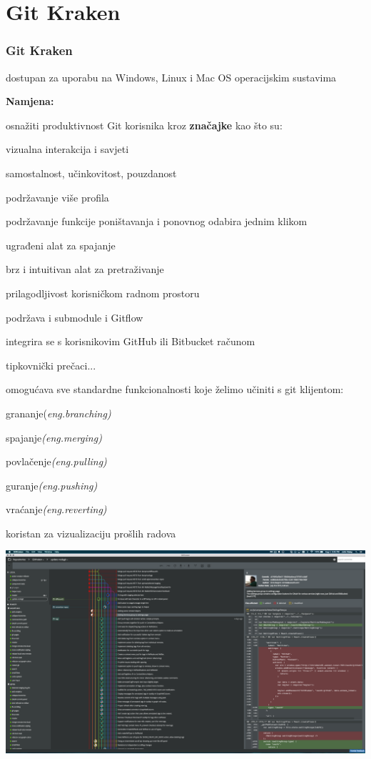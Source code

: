 \section{Git Kraken}
\begin{frame}[allowframebreaks]
\frametitle{Git Kraken}

\begin{itemize}
 \item dostupan za uporabu na Windows, Linux i Mac OS operacijskim sustavima


 \item \textbf{Namjena:} 
 \item osnažiti produktivnost Git korisnika kroz \textbf{značajke} kao što su:
  {\setlength\itemindent{15pt}\item vizualna interakcija i savjeti}
  {\setlength\itemindent{15pt}\item samostalnost, učinkovitost, pouzdanost}
  {\setlength\itemindent{15pt}\item podržavanje više profila}
  {\setlength\itemindent{15pt}\item podržavanje funkcije poništavanja i ponovnog odabira jednim klikom}
  {\setlength\itemindent{15pt}\item ugrađeni alat za spajanje}
  {\setlength\itemindent{15pt}\item brz i intuitivan alat za pretraživanje}
  {\setlength\itemindent{15pt}\item prilagodljivost korisničkom radnom prostoru}
  {\setlength\itemindent{15pt}\item podržava i submodule i Gitflow}
  {\setlength\itemindent{15pt}\item integrira se s korisnikovim GitHub ili Bitbucket računom}
  {\setlength\itemindent{15pt}\item tipkovnički prečaci...}
 \framebreak
 \item omogućava sve standardne funkcionalnosti koje želimo učiniti s git klijentom:
 		\item grananje(\textit {eng.branching)}
 		\item spajanje\textit{(eng.merging)}
 		\item povlačenje\textit{(eng.pulling)}
 		\item guranje\textit{(eng.pushing)}
 		\item vraćanje\textit{(eng.reverting)}
\framebreak
\item koristan za vizualizaciju prošlih radova

\end{itemize}

\begin{center}
    \includegraphics[width=0.8\linewidth]{images/gitkraken-UI.png}
\end{center}

\end{frame}